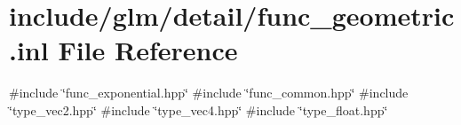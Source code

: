\hypertarget{func__geometric_8inl}{}\section{include/glm/detail/func\+\_\+geometric.inl File Reference}
\label{func__geometric_8inl}
{\ttfamily \#include \char`\"{}func\+\_\+exponential.\+hpp\char`\"{}}\newline
{\ttfamily \#include \char`\"{}func\+\_\+common.\+hpp\char`\"{}}\newline
{\ttfamily \#include \char`\"{}type\+\_\+vec2.\+hpp\char`\"{}}\newline
{\ttfamily \#include \char`\"{}type\+\_\+vec4.\+hpp\char`\"{}}\newline
{\ttfamily \#include \char`\"{}type\+\_\+float.\+hpp\char`\"{}}\newline
